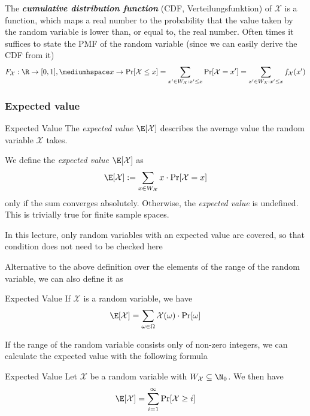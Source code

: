 The \textbf{\textit{cumulative distribution function}} (CDF, Verteilungsfunktion) of $\mathcal{X}$ is a function, which maps a real number to the probability that the value taken by the random variable is lower than, or equal to, the real number.
Often times it suffices to state the PMF of the random variable (since we can easily derive the CDF from it)
\[
    F_{\mathcal{X}} : \R \rightarrow [0, 1], \mediumhspace x\rightarrow \Pr[\mathcal{X} \leq x] = \sum_{x' \in W_{\mathcal{X}} : x' \leq x} \Pr[\mathcal{X} = x'] = \sum_{x' \in W_{\mathcal{X}} : x' \leq x} f_{\mathcal{X}}(x')
\]


\subsubsection{Expected value}
\setcounter{all}{27}
\begin{definition}[]{Expected Value}
    The \textit{expected value} $\E[\mathcal{X}]$ describes the average value the random variable $\mathcal{X}$ takes.

    We define the \textit{expected value} $\E[\mathcal{X}]$ as
    \[
        \E[\mathcal{X}] := \sum_{x \in W_{\mathcal{X}}} x \cdot \Pr[\mathcal{X} = x]
    \]
    only if the sum converges absolutely. Otherwise, the \textit{expected value} is undefined. This is trivially true for finite sample spaces.
\end{definition}
\begin{scriptsize}
    In this lecture, only random variables with an expected value are covered, so that condition does not need to be checked here
\end{scriptsize}

\setcounter{all}{29}
Alternative to the above definition over the elements of the range of the random variable, we can also define it as
\begin{lemma}[]{Expected Value}
    If $\mathcal{X}$ is a random variable, we have
    \[
        \E[\mathcal{X}] = \sum_{\omega \in \Omega} \mathcal{X}(\omega) \cdot \Pr[\omega]
    \]
\end{lemma}

If the range of the random variable consists only of non-zero integers, we can calculate the expected value with the following formula
\begin{theorem}[]{Expected Value}
    Let $\mathcal{X}$ be a random variable with $W_{\mathcal{X}} \subseteq \N_0$. We then have
    \begin{align*}
        \E[\mathcal{X}] = \sum_{i = 1}^{\infty} \Pr[\mathcal{X} \geq i]
    \end{align*}
\end{theorem}


